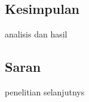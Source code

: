 \chapter{\babEnam}

\section{Kesimpulan}
analisis dan hasil

\section{Saran}
penelitian selanjutnys
